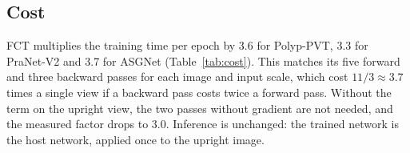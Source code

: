 

\subsection{Cost}
\label{sec:cost}

FCT multiplies the training time per epoch by 3.6 for Polyp-PVT, 3.3 for PraNet-V2 and 3.7 for ASGNet
(Table~\ref{tab:cost}). This matches its five forward and three backward passes for each image and input scale,
which cost $11/3\approx3.7$ times a single view if a backward pass costs twice a forward pass. Without
the term on the upright view, the two passes without gradient are not needed, and the measured factor
drops to 3.0. Inference
is unchanged: the trained network is the host network, applied once to the upright image.


